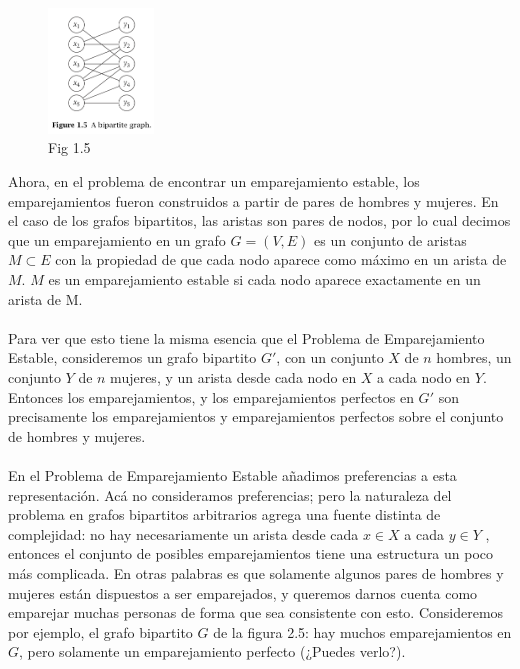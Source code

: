 \documentclass[a4paper]{article}
\begin{document}
\begin{figure}
\includegraphics[width=0.25\textwidth]{Imagenes-Seccion1/fig1-5.PNG}
\caption{ Fig 1.5}
 \label{fig:Imagenes-Seccion1/fig1-5.PNG}
\end{figure}

Ahora, en el problema de encontrar un emparejamiento estable, los emparejamientos fueron construidos a partir de pares de hombres y mujeres. En el caso de los grafos bipartitos, las aristas son pares de nodos, por lo cual decimos que un emparejamiento en un grafo $G = (V,E)$ es un conjunto de aristas $M \subset E$ con la propiedad de que cada nodo aparece como máximo en un arista de $M$. $M$ es un emparejamiento estable si cada nodo aparece exactamente en un arista de M.
\\\\
Para ver que esto tiene la misma esencia que el Problema de Emparejamiento Estable, consideremos un grafo bipartito $G'$, con un conjunto $X$ de $n$ hombres, un conjunto $Y$ de $n$ mujeres, y un arista desde cada nodo en $X$ a cada nodo en $Y$. Entonces los emparejamientos, y los emparejamientos perfectos en $G'$ son precisamente los emparejamientos y emparejamientos perfectos sobre el conjunto de hombres y mujeres.
\\\\
En el Problema de Emparejamiento Estable añadimos preferencias a esta representación. Acá no consideramos preferencias; pero la naturaleza del problema en grafos bipartitos arbitrarios agrega una fuente distinta de complejidad: no hay necesariamente un arista desde cada $x \in X$ a cada $y \in Y$ , entonces el conjunto de posibles emparejamientos tiene una estructura un poco más complicada. En otras palabras es que solamente algunos pares de hombres y mujeres están dispuestos a ser emparejados, y queremos darnos cuenta como emparejar muchas personas de forma que sea consistente con esto. Consideremos por ejemplo, el grafo bipartito $G$ de la figura 2.5: hay muchos emparejamientos en $G$, pero solamente un emparejamiento perfecto (¿Puedes verlo?).
\\\\
\end{document}
